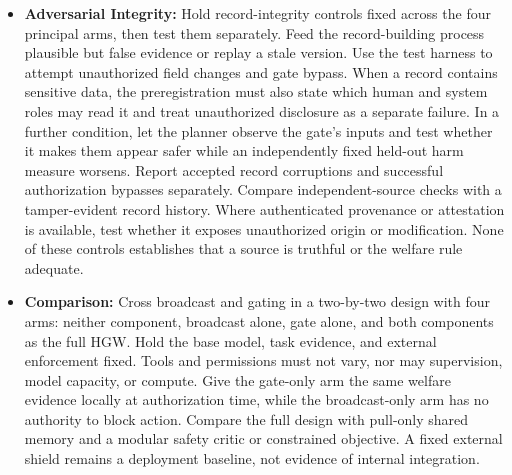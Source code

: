 \documentclass{article}
\begin{document}
\begin{itemize}
    \item \textbf{Adversarial Integrity:} Hold record-integrity controls fixed across the four principal arms, then test them separately. Feed the record-building process plausible but false evidence or replay a stale version. Use the test harness to attempt unauthorized field changes and gate bypass. When a record contains sensitive data, the preregistration must also state which human and system roles may read it and treat unauthorized disclosure as a separate failure. In a further condition, let the planner observe the gate's inputs and test whether it makes them appear safer while an independently fixed held-out harm measure worsens. Report accepted record corruptions and successful authorization bypasses separately. Compare independent-source checks with a tamper-evident record history. Where authenticated provenance or attestation is available, test whether it exposes unauthorized origin or modification. None of these controls establishes that a source is truthful or the welfare rule adequate.
    \item \textbf{Comparison:} Cross broadcast and gating in a two-by-two design with four arms: neither component, broadcast alone, gate alone, and both components as the full HGW. Hold the base model, task evidence, and external enforcement fixed. Tools and permissions must not vary, nor may supervision, model capacity, or compute. Give the gate-only arm the same welfare evidence locally at authorization time, while the broadcast-only arm has no authority to block action. Compare the full design with pull-only shared memory and a modular safety critic or constrained objective. A fixed external shield remains a deployment baseline, not evidence of internal integration.

\end{itemize}
\end{document}
